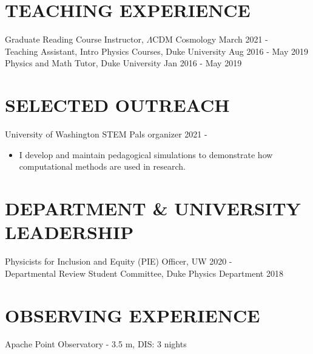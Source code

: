 \documentclass[margin]{res}
\begin{document}
\begin{resume}
\section{\normalfont TEACHING EXPERIENCE}

Graduate Reading Course Instructor, $\Lambda$CDM Cosmology \hfill March 2021 - \\
Teaching Assistant, Intro Physics Courses, Duke University \hfill Aug 2016 - May 2019 \\
Physics and Math Tutor, Duke University \hfill Jan 2016 - May 2019 \\

\section{\normalfont SELECTED OUTREACH}

University of Washington STEM Pals organizer \hfill 2021 - 
\begin{itemize}
    \item I develop and maintain pedagogical simulations to demonstrate how computational methods are used in research.
\end{itemize}

\section{\normalfont DEPARTMENT \& UNIVERSITY LEADERSHIP}

Physicists for Inclusion and Equity (PIE) Officer, UW \hfill 2020 - \\
Departmental Review Student Committee, Duke Physics Department \hfill 2018 \\

\section{\normalfont OBSERVING EXPERIENCE}

Apache Point Observatory - 3.5 m, DIS: 3 nights \\


\end{resume}
\end{document}
